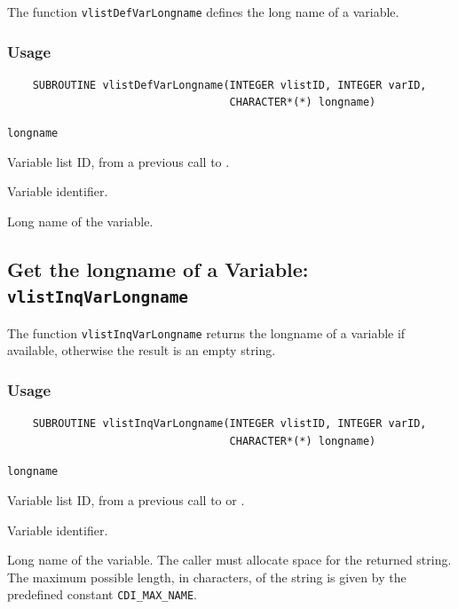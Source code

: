 The function {\texttt{vlistDefVarLongname}} defines the long name of a variable.

\subsubsection*{Usage}

\begin{verbatim}
    SUBROUTINE vlistDefVarLongname(INTEGER vlistID, INTEGER varID, 
                                   CHARACTER*(*) longname)
\end{verbatim}

\hspace*{4mm}\begin{minipage}[]{15cm}
\begin{deflist}{\texttt{longname}\ }
\item[\texttt{vlistID}]
Variable list ID, from a previous call to {}.
\item[\texttt{varID}]
Variable identifier.
\item[\texttt{longname}]
Long name of the variable.

\end{deflist}
\end{minipage}


\subsection{Get the longname of a Variable: \texttt{vlistInqVarLongname}}
\label{vlistInqVarLongname}

The function {\texttt{vlistInqVarLongname}} returns the longname of a variable if available,
otherwise the result is an empty string.

\subsubsection*{Usage}

\begin{verbatim}
    SUBROUTINE vlistInqVarLongname(INTEGER vlistID, INTEGER varID, 
                                   CHARACTER*(*) longname)
\end{verbatim}

\hspace*{4mm}\begin{minipage}[]{15cm}
\begin{deflist}{\texttt{longname}\ }
\item[\texttt{vlistID}]
Variable list ID, from a previous call to {} or {}.
\item[\texttt{varID}]
Variable identifier.
\item[\texttt{longname}]
Long name of the variable. The caller must allocate space for the
                    returned string. The maximum possible length, in characters, of
                    the string is given by the predefined constant {\texttt{CDI\_MAX\_NAME}}.

\end{deflist}
\end{minipage}

